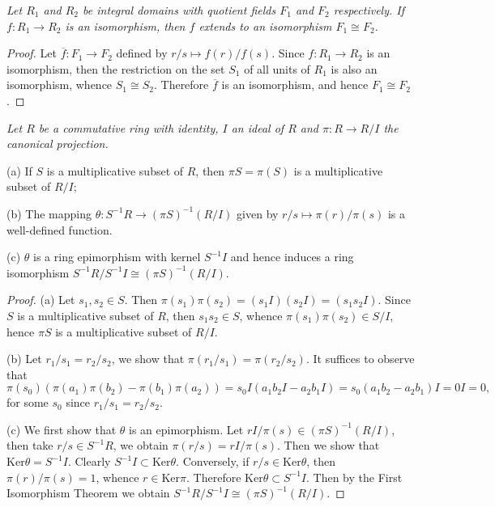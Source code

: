 \begin{problem}\em
Let $R_1$ and $R_2$ be integral domains with quotient fields $F_1$ and $F_2$ respectively. If $f:R_1\to R_2$ is an isomorphism, then $f$ extends to an isomorphism $F_1\cong F_2$.
\end{problem}
\begin{proof}
Let $\overline{f}:F_1\to F_2$ defined by $r/s\mapsto f(r)/f(s)$. Since $f:R_1\to R_2$ is an isomorphism, then the restriction on the set $S_1$ of all units of $R_1$ is also an isomorphism, whence $S_1\cong S_2$. Therefore $\overline{f}$ is an isomorphism, and hence $F_1\cong F_2$.
\end{proof}
\begin{problem}\em
Let $R$ be a commutative ring with identity, $I$ an ideal of $R$ and $\pi:R\to R/I$ the canonical projection.\par
(a) If $S$ is a multiplicative subset of $R$, then $\pi S=\pi(S)$ is a multiplicative subset of $R/I$;\par
(b) The mapping $\theta:S^{-1}R\to(\pi S)^{-1}(R/I)$ given by $r/s\mapsto\pi(r)/\pi(s)$ is a well-defined function.\par
(c) $\theta$ is a ring epimorphism with kernel $S^{-1}I$ and hence induces a ring isomorphism $S^{-1}R/S^{-1}I\cong(\pi S)^{-1}(R/I)$.
\end{problem}
\begin{proof}
(a) Let $s_1,s_2\in S$. Then $\pi(s_1)\pi(s_2)=(s_1I)(s_2I)=(s_1s_2I)$. Since $S$ is a multiplicative subset of $R$, then $s_1s_2\in S$, whence $\pi(s_1)\pi(s_2)\in S/I$, hence $\pi S$ is a multiplicative subset of $R/I$.\par
(b) Let $r_1/s_1=r_2/s_2$, we show that $\pi(r_1/s_1)=\pi(r_2/s_2)$. It suffices to observe that 
$$
\pi \left( s_0 \right) \left( \pi \left( a_1 \right) \pi \left( b_2 \right) -\pi \left( b_1 \right) \pi \left( a_2 \right) \right) =s_0I\left( a_1b_2I-a_2b_1I \right) =s_0\left( a_1b_2-a_2b_1 \right) I=0I=0,
$$
for some $s_0$ since $r_1/s_1=r_2/s_2$.\par
(c) We first show that $\theta$ is an epimorphism. Let $rI/\pi(s)\in(\pi S)^{-1}(R/I)$, then take $r/s\in S^{-1}R$, we obtain $\pi(r/s)=rI/\pi(s)$. Then we show that $\mathrm{Ker}\theta=S^{-1}I$. Clearly $S^{-1}I\subset\mathrm{Ker}\theta$. Conversely, if $r/s\in\mathrm{Ker}\theta$, then $\pi(r)/\pi(s)=1$, whence $r\in\mathrm{Ker}\pi$. Therefore $\mathrm{Ker}\theta\subset S^{-1}I$. Then by the First Isomorphism Theorem we obtain $S^{-1}R/S^{-1}I\cong(\pi S)^{-1}(R/I)$.
\end{proof}
